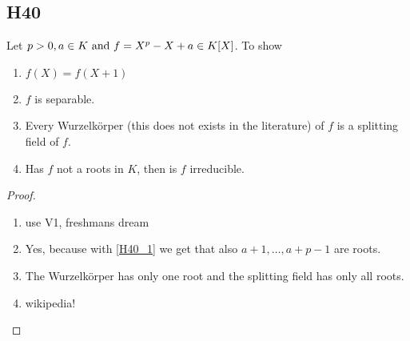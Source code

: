 \subsection{H40}
Let $p > 0, a \in K \text{ and } f = X^p - X + a \in K[X]$. To show
\begin{enumerate}
	\item $f(X) = f(X+1)$ \label{H40_1}
	\item $f$ is separable.
	\item Every Wurzelkörper (this does not exists in the literature) of $f$ is a splitting field of $f$.
	\item Has $f$ not a roots in $K$, then is $f$ irreducible. 
\end{enumerate}
\begin{proof}
	\begin{enumerate}
		\item use V1, freshmans dream
		\item Yes, because with \ref{H40_1} we get that also $a +1, \dots, a+ p-1$ are roots.
		\item The Wurzelkörper has only one root and the splitting field has only all roots.
		\item wikipedia!
	\end{enumerate}
\end{proof}
